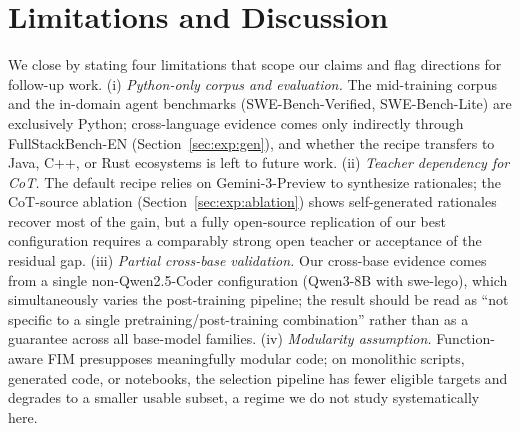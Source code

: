 \section{Limitations and Discussion}
\vspace{-0.5ex}
\label{sec:limitations}

We close by stating four limitations that scope our claims and flag
directions for follow-up work.
(i) \textit{Python-only corpus and evaluation.} The mid-training corpus
and the in-domain agent benchmarks (SWE-Bench-Verified, SWE-Bench-Lite)
are exclusively Python; cross-language evidence comes only indirectly
through FullStackBench-EN (Section~\ref{sec:exp:gen}), and whether the
recipe transfers to Java, C++, or Rust ecosystems is left to future work.
(ii) \textit{Teacher dependency for CoT.} The default recipe relies on
Gemini-3-Preview to synthesize rationales; the CoT-source ablation
(Section~\ref{sec:exp:ablation}) shows self-generated rationales recover
most of the gain, but a fully open-source replication of our best
configuration requires a comparably strong open teacher or acceptance of
the residual gap.
(iii) \textit{Partial cross-base validation.} Our cross-base evidence
comes from a single non-Qwen2.5-Coder configuration (Qwen3-8B with
swe-lego), which simultaneously varies the post-training pipeline; the
result should be read as ``not specific to a single
pretraining/post-training combination'' rather than as a guarantee across
all base-model families.
(iv) \textit{Modularity assumption.} Function-aware FIM presupposes
meaningfully modular code; on monolithic scripts, generated code, or
notebooks, the selection pipeline has fewer eligible targets and degrades
to a smaller usable subset, a regime we do not study systematically here.
